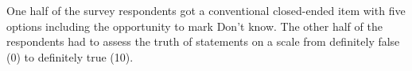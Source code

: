 One half of the survey respondents got a conventional closed-ended item with five options including the opportunity to mark Don’t know. The other half of the respondents had to assess the truth of statements on a scale from definitely false (0) to definitely true (10).


